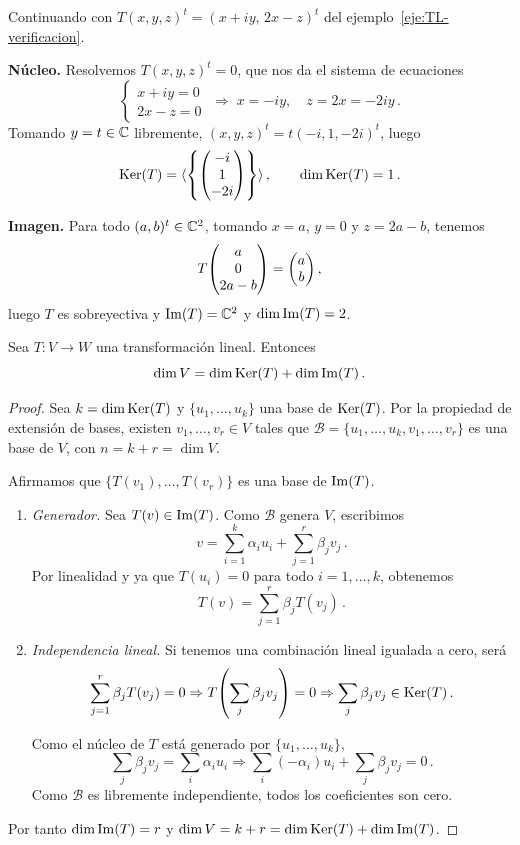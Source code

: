 \begin{eje}
  Continuando con $T(x,y,z)^t=(x+iy,\,2x-z)^t$ del ejemplo~\ref{eje:TL-verificacion}.

  \textbf{Núcleo.} Resolvemos $T(x,y,z)^t=0$, que nos da el sistema de ecuaciones
  \[
    \begin{cases} x+iy=0 \\ 2x-z=0 \end{cases}
    \;\Rightarrow\; x=-iy,\quad z=2x=-2iy\,.
  \]
  Tomando $y=t\in\mathbb{C}$ libremente, $(x,y,z)^t = t(-i,1,-2i)^t$, luego
  \[
    \Ker(T) = \gen{\left\{\mqty(-i\\1\\-2i)\right\}}\,,\qquad \dim\Ker(T)=1\,.
  \]

  \textbf{Imagen.} Para todo $(a,b)^t\in\mathbb{C}^2$, tomando $x=a$, $y=0$ y $z=2a-b$, tenemos
  \[
    T\mqty(a\\0\\2a-b) = \mqty(a\\b)\,,
  \]
  luego $T$ es sobreyectiva y $\operatorname{Im}(T)=\mathbb{C}^2$ y $\dim\operatorname{Im}(T)=2$.
\end{eje}

\begin{theo}
  \label{th:dimension}
  Sea $T\colon V\to W$ una transformación lineal. Entonces
  \[
    \dim V = \dim\operatorname{Ker}(T) + \dim\operatorname{Im}(T)\,.
  \]
\end{theo}
\begin{proof}
  Sea $k=\dim\operatorname{Ker}(T)$ y $\{u_1,\ldots,u_k\}$ una base de $\operatorname{Ker}(T)$. Por la propiedad de extensión de bases, existen $v_1,\ldots,v_r\in V$ tales que $\mathcal{B}=\{u_1,\ldots,u_k,v_1,\ldots,v_r\}$ es una base de $V$, con $n=k+r=\dim V$.

  Afirmamos que $\{T(v_1),\ldots,T(v_r)\}$ es una base de $\operatorname{Im}(T)$.
  \begin{enumerate}
    \item
          \textit{Generador.} Sea $T(v)\in\operatorname{Im}(T)$. Como $\mathcal{B}$ genera $V$, escribimos
          \[
            v=\sum_{i=1}^k\alpha_i u_i+\sum_{j=1}^r\beta_j v_j\,.
          \]
          Por linealidad y ya que $T(u_i)=0$ para todo $i=1,\ldots,k$, obtenemos
          \[
            T(v)=\sum_{j=1}^r\beta_j T(v_j)\,.
          \]

    \item
          \textit{Independencia lineal.} Si tenemos una combinación lineal igualada a cero, será
          \[
            \sum_{j=1}^r\beta_j T(v_j)=0
            \Rightarrow T\left(\sum_j\beta_j v_j\right)=0
            \Rightarrow \sum_j\beta_j v_j\in\Ker(T)\,.
          \]

          Como el núcleo de $T$ está generado por $\{u_1,\ldots,u_k\}$,
          \[
            \sum_j\beta_j v_j=\sum_i\alpha_i u_i\Rightarrow \sum_i(-\alpha_i)u_i+\sum_j\beta_j v_j=0\,.
          \]
          Como $\mathcal{B}$ es libremente independiente, todos los coeficientes son cero.
  \end{enumerate}

  Por tanto $\dim\operatorname{Im}(T)=r$ y $\dim V=k+r=\dim\operatorname{Ker}(T)+\dim\operatorname{Im}(T)$.
\end{proof}

